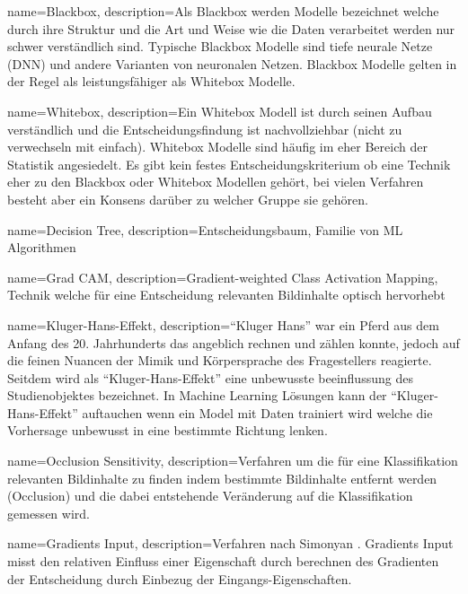 {
	name=Blackbox,
	description={Als Blackbox werden Modelle bezeichnet welche durch ihre Struktur und die Art und Weise wie die Daten verarbeitet werden nur schwer verständlich sind. Typische Blackbox Modelle sind tiefe neurale Netze (DNN) und andere Varianten von neuronalen Netzen. Blackbox Modelle gelten in der Regel als leistungsfähiger als Whitebox Modelle.}                                   
}     

{
	name=Whitebox,
	description={Ein Whitebox Modell ist durch seinen Aufbau verständlich und die Entscheidungsfindung ist nachvollziehbar (nicht zu verwechseln mit einfach). Whitebox Modelle sind häufig im eher Bereich der Statistik angesiedelt. Es gibt kein festes Entscheidungskriterium ob eine Technik eher zu den Blackbox oder Whitebox Modellen gehört, bei vielen Verfahren besteht aber ein Konsens darüber zu welcher Gruppe sie gehören.}                                   
}     

{
	name=Decision Tree,
	description={Entscheidungsbaum, Familie von ML Algorithmen}                                   
}     

{
	name=Grad CAM,
	description={Gradient-weighted Class Activation Mapping, Technik welche für eine Entscheidung relevanten Bildinhalte optisch hervorhebt}  
}

{
	name=Kluger-Hans-Effekt,
	description={``Kluger Hans'' war ein Pferd aus dem Anfang des 20. Jahrhunderts das angeblich rechnen und zählen konnte, jedoch auf  die feinen Nuancen der Mimik und Körpersprache des Fragestellers reagierte. Seitdem wird als ``Kluger-Hans-Effekt'' eine unbewusste beeinflussung des Studienobjektes bezeichnet. In Machine Learning Lösungen kann der ``Kluger-Hans-Effekt'' auftauchen wenn ein Model mit Daten trainiert wird welche die Vorhersage unbewusst in eine bestimmte Richtung lenken.}  
}

{
	name=Occlusion Sensitivity,
	description={Verfahren um die für eine Klassifikation relevanten Bildinhalte zu finden indem bestimmte Bildinhalte entfernt werden (Occlusion) und die dabei entstehende Veränderung auf die Klassifikation gemessen wird.}  
}

{
	name=Gradients Input,
	description={Verfahren nach Simonyan \parencite{Simonyan2013}. Gradients Input misst den relativen Einfluss einer Eigenschaft durch berechnen des Gradienten der Entscheidung durch Einbezug der Eingangs-Eigenschaften.}  
}

